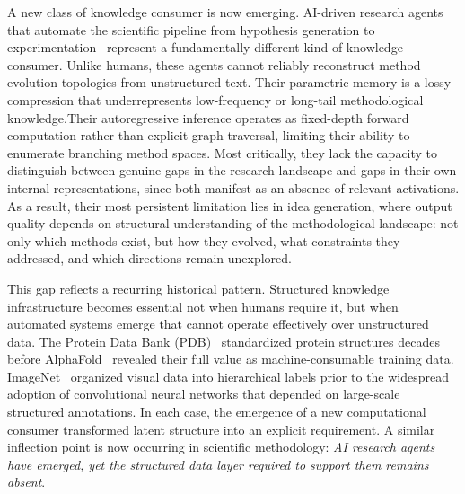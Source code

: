\documentclass{opendatalab}
\begin{document}
A new class of knowledge consumer is now emerging. AI-driven research agents that automate the scientific pipeline from hypothesis generation to experimentation~\cite{lu2024ai,sanyal2025spark,fan2026deepinnovator} represent a fundamentally different kind of knowledge consumer. Unlike humans, these agents cannot reliably reconstruct method evolution topologies from unstructured text. Their parametric memory is a lossy compression that underrepresents low-frequency or long-tail methodological knowledge.Their autoregressive inference operates as fixed-depth forward computation rather than explicit graph traversal, limiting their ability to enumerate branching method spaces. Most critically, they lack the capacity to distinguish between genuine gaps in the research landscape and gaps in their own internal representations, since both manifest as an absence of relevant activations. As a result, their most persistent limitation lies in idea generation, where output quality depends on structural understanding of the methodological landscape: not only which methods exist, but how they evolved, what constraints they addressed, and which directions remain unexplored.

This gap reflects a recurring historical pattern. Structured knowledge infrastructure becomes essential not when humans require it, but when automated systems emerge that cannot operate effectively over unstructured data. The Protein Data Bank (PDB)~\cite{berman2000protein} standardized protein structures decades before AlphaFold~\cite{jumper2021highly} revealed their full value as machine-consumable training data. ImageNet~\cite{deng2009imagenet} organized visual data into hierarchical labels prior to the widespread adoption of convolutional neural networks that depended on large-scale structured annotations. In each case, the emergence of a new computational consumer transformed latent structure into an explicit requirement. A similar inflection point is now occurring in scientific methodology: \textit{AI research agents have emerged, yet the structured data layer required to support them remains absent}.
\end{document}
